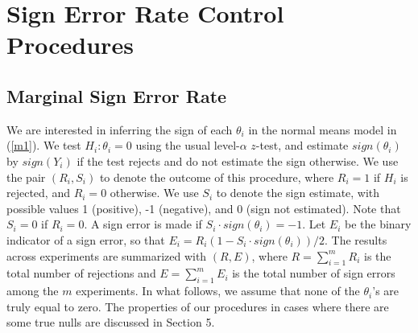 \documentclass[11pt]{article}
\begin{document}
\section{Sign Error Rate Control Procedures}

\subsection{Marginal Sign Error Rate}
We are interested in inferring the sign of each $\theta_i$ in the normal means model in (\ref{m1}). We test $H_i: \theta_i = 0$ using the usual level-$\alpha$ $z$-test,  and estimate $sign(\theta_i)$ by $sign(Y_i)$ if the test rejects and do not estimate the sign otherwise. We use the pair $(R_i, S_i)$ to denote the outcome of this procedure, where $R_i=1$ if $H_i$ is rejected, and $R_i = 0$ otherwise. We use $S_i$ to denote the sign estimate, with possible values 1 (positive), -1 (negative), and 0 (sign not estimated). Note that $S_i = 0$ if $R_i = 0$. A sign error is made if $S_i \cdot sign(\theta_i) = -1$. 
Let $E_i$ be the binary indicator of a sign error, so that $E_i = R_i(1-S_i \cdot sign(\theta_i))/2$. The results across experiments are summarized with $(R, E)$, where $R = \sum_{i=1}^{m} R_i$ is the total number of rejections and $E = \sum_{i=1}^{m} E_i$ is the total number of sign errors among the $m$ experiments. 
In what follows, we assume that none of the $\theta_i$'s are truly equal to 
zero. The properties of our procedures in cases where there are 
some true nulls are discussed in Section 5. 
\end{document}
